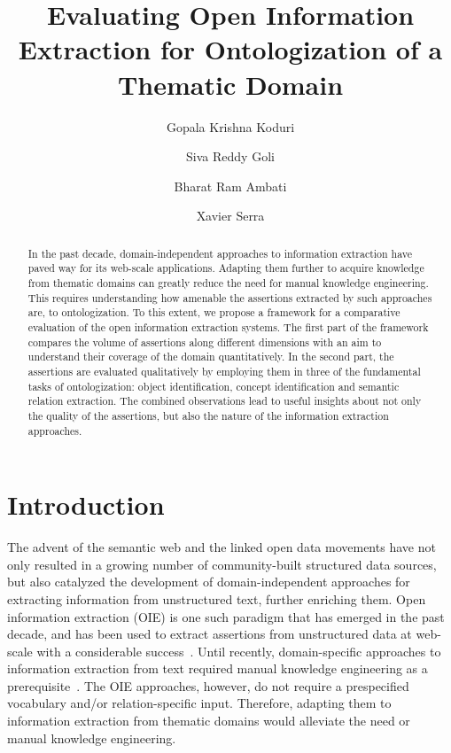 \documentclass{llncs}
\begin{document}
\title{Evaluating Open Information Extraction for Ontologization of a Thematic Domain}

\author{Gopala Krishna Koduri \and Siva Reddy Goli \and Bharat Ram Ambati \and Xavier Serra}

\maketitle

\begin{abstract}
In the past decade, domain-independent approaches to information extraction have paved way for its web-scale applications. Adapting them further to acquire knowledge from thematic domains can greatly reduce the need for manual knowledge engineering. This requires understanding how amenable the assertions extracted by such approaches are, to ontologization. To this extent, we propose a framework for a comparative evaluation of the open information extraction systems. The first part of the framework compares the volume of assertions along different dimensions with an aim to understand their coverage of the domain quantitatively. In the second part, the assertions are evaluated qualitatively by employing them in three of the fundamental tasks of ontologization: object identification, concept identification and semantic relation extraction. The combined observations lead to useful insights about not only the quality of the assertions, but also the nature of the information extraction approaches.
\end{abstract}

\section{Introduction}
\label{sec:intro}
The advent of the semantic web and the linked open data movements have not only resulted in a growing number of community-built structured data sources, but also catalyzed the development of domain-independent approaches for extracting information from unstructured text, further enriching them. Open information extraction (OIE) is one such paradigm that has emerged in the past decade, and has been used to extract assertions from unstructured data at web-scale with a considerable success~\cite{Etzioni2008a}. Until recently, domain-specific approaches to information extraction from text required manual knowledge engineering as a prerequisite~\cite{Sarawagi2008}. The OIE approaches, however, do not require a prespecified vocabulary and/or relation-specific input. Therefore, adapting them to information extraction from thematic domains would alleviate the need or manual knowledge engineering.
\end{document}
